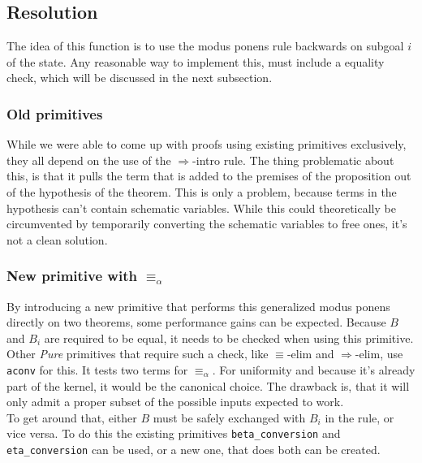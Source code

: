 \subsection{Resolution}

The idea of this function is to use the modus ponens rule backwards on subgoal $i$ of the state. Any reasonable way to implement this, must include a equality check, which will be discussed in the next subsection.

\subsubsection{Old primitives}

While we were able to come up with proofs using existing primitives exclusively, they all depend on the use of the $\Longrightarrow$-intro rule. The thing problematic about this, is that it pulls the term that is added to the premises of the proposition out of the hypothesis of the theorem. This is only a problem, because terms in the hypothesis can't contain schematic variables. While this could theoretically be circumvented by temporarily converting the schematic variables to free ones, it's not a clean solution.

\subsubsection{New primitive with $\equiv_\alpha$}

By introducing a new primitive that performs this generalized modus ponens directly on two theorems, some performance gains can be expected. Because $B$ and $B_i$ are required to be equal, it needs to be checked when using this primitive. Other \textit{Pure} primitives that require such a check, like $\equiv$-elim and $\Longrightarrow$-elim, use \texttt{aconv} for this. It tests two terms for $\equiv_\alpha$. For uniformity and because it's already part of the kernel, it would be the canonical choice. The drawback is, that it will only admit a proper subset of the possible inputs expected to work.\\
To get around that, either $B$ must be safely exchanged with $B_i$ in the rule, or vice versa. To do this the existing primitives \texttt{beta\_conversion} and \texttt{eta\_conversion} can be used, or a new one, that does both can be created.

